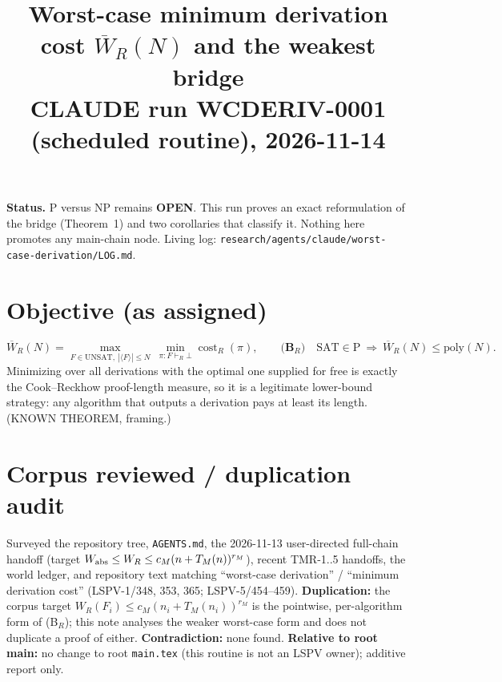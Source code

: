 \documentclass[11pt]{article}
\title{Worst-case minimum derivation cost $\overline W_R(N)$ and the weakest bridge\\
\small CLAUDE run WCDERIV-0001 (scheduled routine), 2026-11-14}
\date{}
\begin{document}
\maketitle
\noindent\textbf{Status.} P versus NP remains \textbf{OPEN}. This run proves an exact
reformulation of the bridge (Theorem~1) and two corollaries that classify it. Nothing here
promotes any main-chain node. Living log:
\texttt{research/agents/claude/worst-case-derivation/LOG.md}.

\section{Objective (as assigned)}
\[
\overline W_R(N)=\max_{F\in\mathrm{UNSAT},\ |\langle F\rangle|\le N}\ \min_{\pi:F\vdash_R\bot}\operatorname{cost}_R(\pi),
\qquad
\textbf{(B$_R$)}\quad \mathrm{SAT}\in\mathrm P\ \Longrightarrow\ \overline W_R(N)\le \mathrm{poly}(N).
\]
Minimizing over all derivations with the optimal one supplied for free is exactly the
Cook--Reckhow proof-length measure, so it is a legitimate lower-bound strategy: any
algorithm that outputs a derivation pays at least its length. (KNOWN THEOREM, framing.)

\section{Corpus reviewed / duplication audit}
Surveyed the repository tree, \texttt{AGENTS.md}, the 2026-11-13 user-directed full-chain
handoff (target $W_{\rm abs}\le W_R\le c_M(n+T_M(n))^{r_M}$), recent TMR-1..5 handoffs,
the world ledger, and repository text matching ``worst-case derivation'' /
``minimum derivation cost'' (LSPV-1/348, 353, 365; LSPV-5/454--459). \textbf{Duplication:}
the corpus target $W_R(F_i)\le c_M(n_i+T_M(n_i))^{r_M}$ is the pointwise, per-algorithm form of
(B$_R$); this note analyses the weaker worst-case form and does not duplicate a proof
of either. \textbf{Contradiction:} none found. \textbf{Relative to root main:} no change to
root \texttt{main.tex} (this routine is not an LSPV owner); additive report only.
\end{document}

